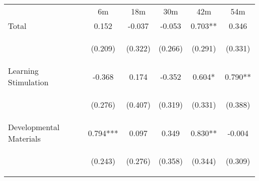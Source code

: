 \begin{tabular}{lccccc}
\hline \noalign{\smallskip} & 6m & 18m & 30m & 42m & 54m\\
\noalign{\smallskip}\hline \noalign{\smallskip}Total & 0.152 & -0.037 & -0.053 & 0.703** & 0.346\\
 & \begin{footnotesize}(0.209)\end{footnotesize} & \begin{footnotesize}(0.322)\end{footnotesize} & \begin{footnotesize}(0.266)\end{footnotesize} & \begin{footnotesize}(0.291)\end{footnotesize} & \begin{footnotesize}(0.331)\end{footnotesize}\\
\noalign{\smallskip}Learning Stimulation & -0.368 & 0.174 & -0.352 & 0.604* & 0.790**\\
 & \begin{footnotesize}(0.276)\end{footnotesize} & \begin{footnotesize}(0.407)\end{footnotesize} & \begin{footnotesize}(0.319)\end{footnotesize} & \begin{footnotesize}(0.331)\end{footnotesize} & \begin{footnotesize}(0.388)\end{footnotesize}\\
\noalign{\smallskip}Developmental Materials & 0.794*** & 0.097 & 0.349 & 0.830** & -0.004\\
 & \begin{footnotesize}(0.243)\end{footnotesize} & \begin{footnotesize}(0.276)\end{footnotesize} & \begin{footnotesize}(0.358)\end{footnotesize} & \begin{footnotesize}(0.344)\end{footnotesize} & \begin{footnotesize}(0.309)\end{footnotesize}\\

\end{tabular}
